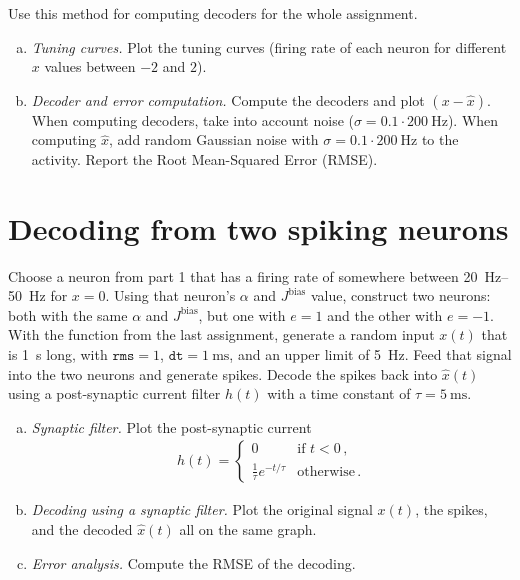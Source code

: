 	Use this method for computing decoders for the whole assignment.

	\begin{enumerate}[a)]
		\item {} \emph{Tuning curves.} Plot the tuning curves (firing rate of each neuron for different $x$ values between $-2$ and $2$).
		\item {} \emph{Decoder and error computation.} Compute the decoders and plot $(x-\hat{x})$. When computing decoders, take into account noise ($\sigma=0.1 \cdot \SI{200}{\hertz}$). When computing $\hat{x}$, add random Gaussian noise with $\sigma=0.1 \cdot \SI{200}{\hertz}$ to the activity. Report the Root Mean-Squared Error (RMSE).
	\end{enumerate}

	\section{Decoding from two spiking neurons}
	
	Choose a neuron from part 1 that has a firing rate of somewhere between \SIrange{20}{50}{\hertz} for $x=0$. Using that neuron's $\alpha$ and $J^\mathrm{bias}$ value, construct two neurons: both with the same $\alpha$ and $J^\mathrm{bias}$, but one with $e=1$ and the other with $e=-1$. With the function from the last assignment, generate a random input $x(t)$ that is \SI{1}{\second} long, with $\mathtt{rms}=1$, $\mathtt{dt}=\SI{1}{\milli\second}$, and an upper limit of \SI{5}{\hertz}. Feed that signal into the two neurons and generate spikes. Decode the spikes back into $\hat{x}(t)$ using a post-synaptic current filter $h(t)$ with a time constant of $\tau=\SI{5}{\milli\second}$.

	\begin{enumerate}[a)]
		\item {} \emph{Synaptic filter.} Plot the post-synaptic current
		\begin{align*}
			h(t)= \begin{cases}
				0 & \text{if } t < 0 \,, \\
				\frac{1}\tau e^{-t/\tau} & \text{otherwise} \,.
			\end{cases}
		\end{align*}
		\item {} \emph{Decoding using a synaptic filter.} Plot the original signal $x(t)$, the spikes, and the decoded $\hat{x}(t)$ all on the same graph.
		\item {} \emph{Error analysis.} Compute the RMSE of the decoding.
	\end{enumerate}

